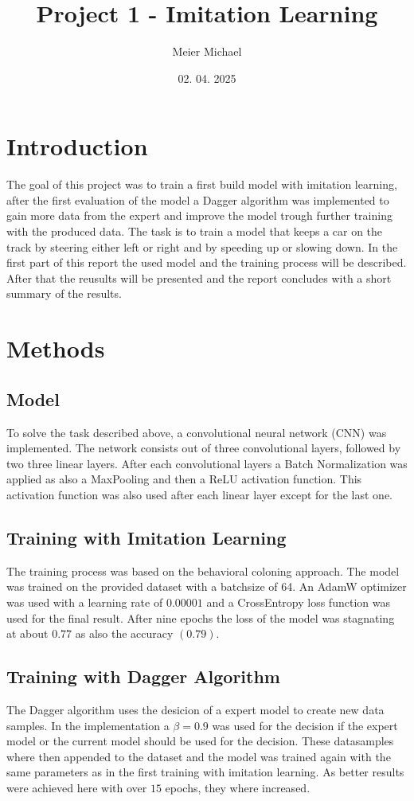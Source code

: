 \documentclass[a4paper, 9pt]{extarticle}
\title{Project 1 - Imitation Learning}
\author{Meier Michael}
\date{02. 04. 2025}
\begin{document}
\maketitle

\section*{Introduction}
The goal of this project was to train a first build model with imitation learning, after 
the first evaluation of the model a Dagger algorithm was implemented to gain more data from the expert 
and improve the model trough further training with the produced data. The task is to train a model that keeps a car 
on the track by steering either left or right and by speeding up or slowing down. In the first part of this report the 
used model and the training process will be described. After that the reusults will be presented and the report concludes with
a short summary of the results. 

\section*{Methods}
\subsection{Model}
To solve the task described above, a convolutional neural network (CNN) was implemented. The network
consists out of three convolutional layers, followed by two three linear layers. After each convolutional layers
a Batch Normalization was applied as also a MaxPooling and then a ReLU activation function. This activation function
was also used after each linear layer except for the last one. 

\subsection{Training with Imitation Learning}
The training process was based on the behavioral coloning approach. The model was trained on the provided dataset with a batchsize of 64. 
An AdamW optimizer was used with a learning rate of $0.00001$ and a CrossEntropy loss function was used for the final result. 
After nine epochs the loss of the model was stagnating at about $0.77$ as also the accuracy $(0.79)$.

\subsection{Training with Dagger Algorithm}
The Dagger algorithm uses the desicion of a expert model to create new data samples. In the implementation 
a $\beta = 0.9$ was used for the decision if the expert model or the current model should be used for the decision. 
These datasamples where then appended to the dataset and the model was trained again with the same parameters as in the first 
training with imitation learning. As better results were achieved here with over $15$ epochs, they where
increased. 
\end{document}
